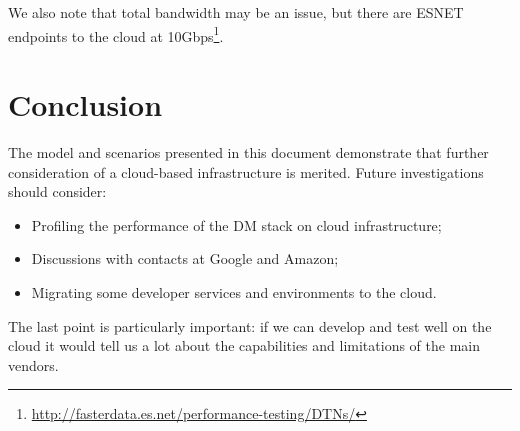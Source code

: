 We also note that total bandwidth may be an issue, but there are ESNET endpoints to the cloud at 10Gbps\footnote{\url{http://fasterdata.es.net/performance-testing/DTNs/}}.

\section{Conclusion}

The model and scenarios presented in this document demonstrate that further consideration of a cloud-based infrastructure is merited.
Future investigations should consider:

\begin{itemize}

  \item{Profiling the performance of the DM stack on cloud infrastructure;}
  \item{Discussions with contacts at Google and Amazon;}
  \item{Migrating some developer services and environments to the cloud.}

\end{itemize}

The last point is particularly important: if we can develop and test well on the cloud it would tell us a lot about the capabilities and limitations of the main vendors.
